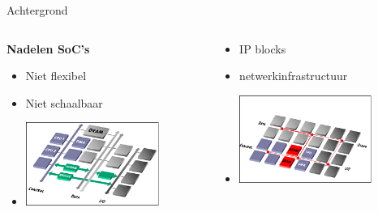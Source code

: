 \documentclass[10pt]{beamer}
\begin{document}
\begin{frame}[label=achtergrond2]{Achtergrond}

    \begin{columns}
        \begin{column}[t]{5cm}
            {\bf Nadelen SoC's}
            \begin{itemize}
                \item <1->Niet flexibel
                \item <1->Niet schaalbaar
                \item <3->\includegraphics[width=0.75\textwidth]{trad-bus}
            \end{itemize}
        \end{column}
        \begin{column}[t]{5cm}
            \begin{itemize}
                \item <2->IP blocks
                \item <2->netwerkinfrastructuur
                \item <3->\includegraphics[width=0.75\textwidth]{switch-fabric}
            \end{itemize}
        \end{column}
    \end{columns}

\end{frame}
\end{document}
